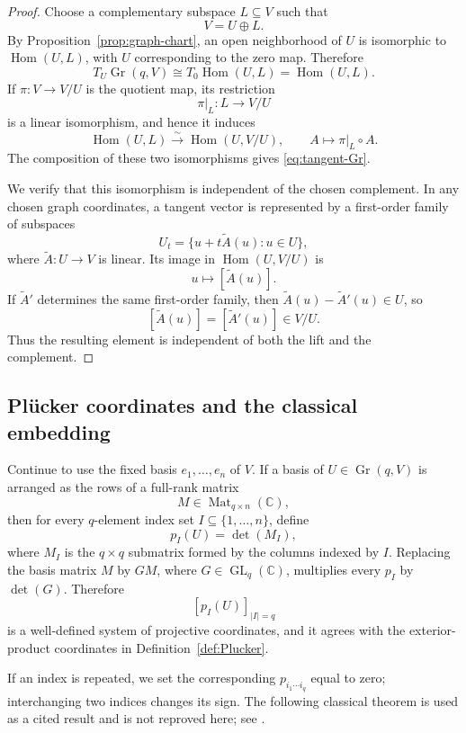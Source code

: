 \documentclass{siamonline250211}
\newcommand{\CC}{\mathbb C}
\newcommand{\Gr}{\operatorname{Gr}}
\newcommand{\Hom}{\operatorname{Hom}}
\begin{document}
\begin{proof}
Choose a complementary subspace $L\subseteq V$ such that
\[
  V=U\oplus L.
\]
By Proposition~\ref{prop:graph-chart}, an open neighborhood of $U$ is isomorphic
to $\Hom(U,L)$, with $U$ corresponding to the zero map. Therefore
\[
  T_U\Gr(q,V)\cong T_0\Hom(U,L)=\Hom(U,L).
\]
If $\pi:V\to V/U$ is the quotient map, its restriction
\[
  \pi|_L:L\longrightarrow V/U
\]
is a linear isomorphism, and hence it induces
\[
  \Hom(U,L)\xrightarrow{\sim}\Hom(U,V/U),
  \qquad A\longmapsto\pi|_L\circ A.
\]
The composition of these two isomorphisms gives \eqref{eq:tangent-Gr}.

We verify that this isomorphism is independent of the chosen complement. In any
chosen graph coordinates, a tangent vector is represented by a first-order
family of subspaces
\[
  U_t=\{u+t\widetilde A(u):u\in U\},
\]
where $\widetilde A:U\to V$ is linear. Its image in $\Hom(U,V/U)$ is
\[
  u\longmapsto[\widetilde A(u)].
\]
If $\widetilde A'$ determines the same first-order family, then
$\widetilde A(u)-\widetilde A'(u)\in U$, so
\[
  [\widetilde A(u)]=[\widetilde A'(u)]\in V/U.
\]
Thus the resulting element is independent of both the lift and the complement.
\end{proof}

\subsection{Pl\texorpdfstring{\"u}{u}cker coordinates and the classical embedding}

Continue to use the fixed basis $e_1,\ldots,e_n$ of $V$. If a basis of
$U\in\Gr(q,V)$ is arranged as the rows of a full-rank matrix
\[
  M\in\operatorname{Mat}_{q\times n}(\CC),
\]
then for every $q$-element index set $I\subseteq\{1,\ldots,n\}$, define
\begin{equation}\label{eq:Plucker-coordinate}
  p_I(U)=\det(M_I),
\end{equation}
where $M_I$ is the $q\times q$ submatrix formed by the columns indexed by $I$.
Replacing the basis matrix $M$ by $GM$, where
$G\in\operatorname{GL}_q(\CC)$, multiplies every $p_I$ by $\det(G)$. Therefore
\[
  [p_I(U)]_{|I|=q}
\]
is a well-defined system of projective coordinates, and it agrees with the
exterior-product coordinates in Definition~\ref{def:Plucker}.

If an index is repeated, we set the corresponding
$p_{i_1\cdots i_q}$ equal to zero; interchanging two indices changes its sign.
The following classical theorem is used as a cited result and is not reproved
here; see
\cite[Lecture~6, pp.~63--67]{Har92}.
\end{document}
